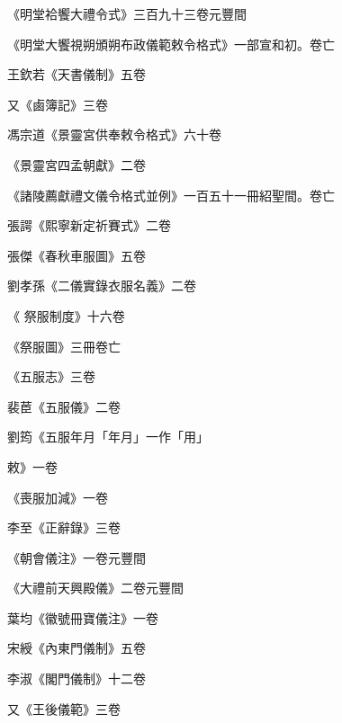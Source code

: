\begin{pinyinscope}
 《明堂袷饗大禮令式》三百九十三卷元豐間



 《明堂大饗視朔頒朔布政儀範敕令格式》一部宣和初。卷亡



 王欽若《天書儀制》五卷



 又《鹵簿記》三卷



 馮宗道《景靈宮供奉敕令格式》六十卷



 《景靈宮四孟朝獻》二卷



 《諸陵薦獻禮文儀令格式並例》一百五十一冊紹聖間。卷亡



 張諤《熙寧新定祈賽式》二卷



 張傑《春秋車服圖》五卷



 劉孝孫《二儀實錄衣服名義》二卷



 《
 祭服制度》十六卷



 《祭服圖》三冊卷亡



 《五服志》三卷



 裴茞《五服儀》二卷



 劉筠《五服年月「年月」一作「用」



 敕》一卷



 《喪服加減》一卷



 李至《正辭錄》三卷



 《朝會儀注》一卷元豐間



 《大禮前天興殿儀》二卷元豐間



 葉均《徽號冊寶儀注》一卷



 宋綬《內東門儀制》五卷



 李淑《閣門儀制》十二卷



 又《王後儀範》三卷




\end{pinyinscope}
